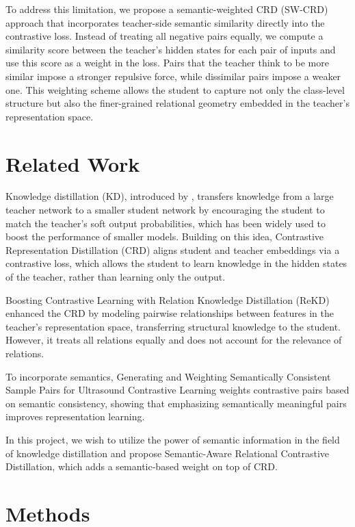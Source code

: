 \documentclass{article}
\theoremstyle{plain}
\theoremstyle{remark}
\begin{document}
To address this limitation, we propose a semantic-weighted CRD (SW-CRD) approach that incorporates teacher-side semantic similarity directly into the contrastive loss. Instead of treating all negative pairs equally, we compute a similarity score between the teacher’s hidden states for each pair of inputs and use this score as a weight in the loss. Pairs that the teacher think to be more similar impose a stronger repulsive force, while dissimilar pairs impose a weaker one. This weighting scheme allows the student to capture not only the class-level structure but also the finer-grained relational geometry embedded in the teacher’s representation space.

\section{Related Work}
Knowledge distillation (KD), introduced by \citet{hinton2015distilling}, transfers knowledge from a large teacher network to a smaller student network by encouraging the student to match the teacher’s soft output probabilities, which has been widely used to boost the performance of smaller models. Building on this idea, Contrastive Representation Distillation (CRD) \citep{crd_tian2022crd} aligns student and teacher embeddings via a contrastive loss, which allows the student to learn knowledge in the hidden states of the teacher, rather than learning only the output.  

Boosting Contrastive Learning with Relation Knowledge Distillation (ReKD) \citep{RKDCL_zheng2021boostingcontrastivelearningrelation} enhanced the CRD by modeling pairwise relationships between features in the teacher’s representation space, transferring structural knowledge to the student. However, it treats all relations equally and does not account for the relevance of relations. 

To incorporate semantics, Generating and Weighting Semantically Consistent Sample Pairs for Ultrasound Contrastive Learning \citep{semantic_chen2022generatingweightingsemanticallyconsistent} weights contrastive pairs based on semantic consistency, showing that emphasizing semantically meaningful pairs improves representation learning. 

In this project, we wish to utilize the power of semantic information in the field of knowledge distillation and propose Semantic-Aware Relational Contrastive Distillation, which adds a semantic-based weight on top of CRD.

\section{Methods}
\end{document}
